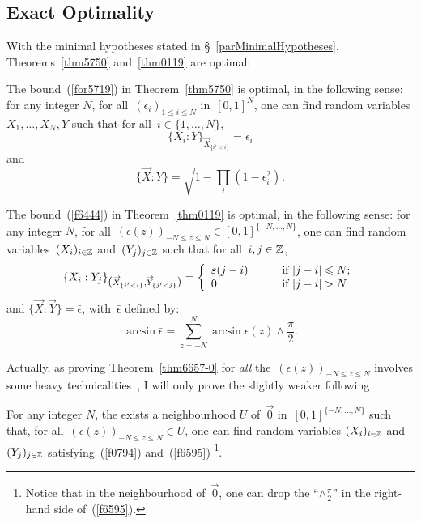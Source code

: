 \subsection{Exact Optimality}

With the minimal hypotheses stated in \S~\ref{parMinimalHypotheses},
Theorems~\ref{thm5750} and~\ref{thm0119} are optimal:
%
\begin{Thm}\label{t6656}
The bound~(\ref{for5719}) in Theorem~\ref{thm5750} is optimal, in the following sense:
for any integer $N$, for all~$(\epsilon_i)_{1\leq i\leq N}$ in~$[0,1]^N$,
one can find random variables $X_1, \ldots, X_N, Y$ such that
for all~$i \in \{1,\ldots,N\}$,
\[\label{f6808} \{X_i:Y\}_{\vec{X}_{\{i'<i\}}} = \epsilon_i \]
and
\[ \{ \vec{X} : Y \} = \sqrt{1-\prod_{i}(1-\epsilon_i^2)} .\]
\end{Thm}

\begin{Thm}\label{thm6657-0}
The bound~(\ref{f6444}) in Theorem~\ref{thm0119} is optimal, in the following sense:
for any integer $N$, for all~$(\epsilon(z))_{-N\leq z\leq N} \in [0,1]^{\{-N,\ldots,N\}}$,
one can find random variables~$(X_i)_{i\in\mathbb{Z}}$ and~$(Y_j)_{j\in\mathbb{Z}}$ such that for all~$i,j\in\mathbb{Z}$,
\[\label{f0794} \{ X_i : Y_j \}_{\mathlarger{(}\vec{X}_{\{i'<i\}},\vec{Y}_{\{j'<j\}}\mathlarger{)}}
= \left\{ \begin{array}{lcl} \epsilon(j-i) & \quad & \text{if $|j-i| \leq N$;} \\
0 & \quad & \text{if $|j-i| > N$} \end{array} \right.\]
and ${\{ \vec{X} : \vec{Y} \}} = \bar{\epsilon}$, with~$\bar{\epsilon}$ defined by:
\[\label{f6595} \arcsin \bar{\epsilon} = \sum_{z=-N}^N \arcsin \epsilon(z)
\wedge \frac{\pi}{2} .\]
\end{Thm}

Actually, as proving Theorem~\ref{thm6657-0} for \emph{all} the~$(\epsilon(z))_{-N\leq z\leq N}$
involves some heavy technicalities~\cite{perso},
I will only prove the slightly weaker following
%
\begin{Thm}\label{t6657}
For any integer $N$, the exists a neighbourhood $U$ of~$\vec{0}$ in~$[0,1]^{\{-N,\ldots,N\}}$
such that, for all~$(\epsilon(z))_{-N\leq z\leq N} \in U$, one can find random variables
$(X_i)_{i\in\mathbb{Z}}$ and~$(Y_j)_{j\in\mathbb{Z}}$ satisfying~(\ref{f0794}) and~(\ref{f6595})%
\footnote{Notice that in the neighbourhood of~$\vec{0}$,
one can drop the ``$\wedge\frac{\pi}{2}$'' in the right-hand side of~(\ref{f6595}).}.
\end{Thm}

